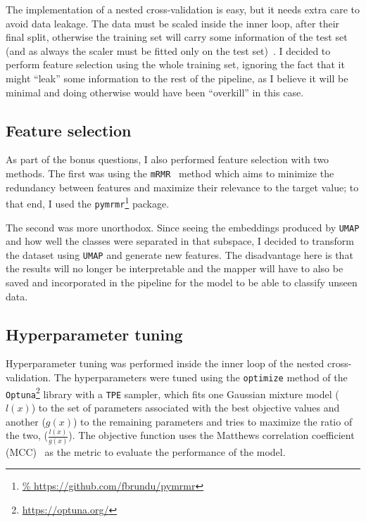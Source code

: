 \documentclass[12pt]{article}
\begin{document}
The implementation of a nested cross-validation is easy, but it needs extra
care to avoid data leakage. The data must be scaled inside the inner loop, after
their final split, otherwise the training set will carry some information of the
test set (and as always the scaler must be fitted only on the test
set)~\cite{Bates_2023}. I decided to perform feature selection using the whole
training set, ignoring the fact that it might ``leak'' some information to the
rest of the pipeline, as I believe it will be minimal and doing otherwise would
have been ``overkill'' in this case.


\subsection{Feature selection}

As part of the bonus questions, I also performed feature selection with two
methods. The first was using the \texttt{mRMR}~\cite{mRMR} method which aims to
minimize the redundancy between features and maximize their relevance to the
target value; to that end, I used the \texttt{pymrmr}\footnote{\url{%
https://github.com/fbrundu/pymrmr}} package.

The second was more unorthodox. Since seeing the embeddings produced by
\texttt{UMAP} and how well the classes were separated in that subspace, I
decided to transform the dataset using \texttt{UMAP} and generate new features.
The disadvantage here is that the results will no longer be interpretable and
the mapper will have to also be saved and incorporated in the pipeline for
the model to be able to classify unseen data.


\subsection{Hyperparameter tuning}

Hyperparameter tuning was performed inside the inner loop of the nested
cross-validation. The hyperparameters were tuned using the \texttt{optimize}
method of the \texttt{Optuna}\footnote{%
\url{https://optuna.org/}} library with a \texttt{TPE} sampler, which fits
one Gaussian mixture model ($l(x)$) to the set of parameters associated with the
best objective values and another ($g(x)$) to the remaining parameters and tries
to maximize the ratio of the two, ($\frac{l(x)}{g(x)}$). The objective function
uses the Matthews correlation coefficient (MCC)~\cite{Chicco2023} as the metric
to evaluate the performance of the model.
\end{document}
